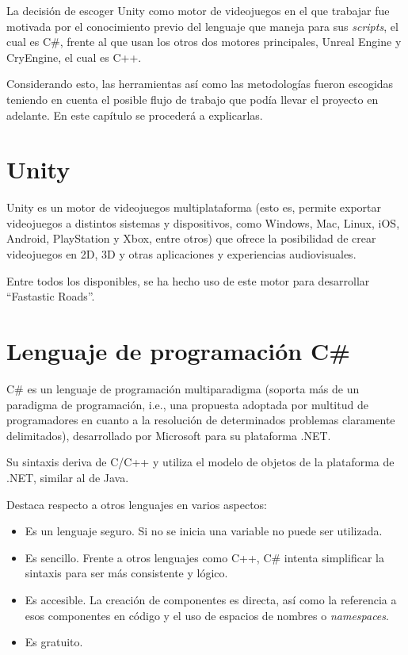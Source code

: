  \label{cap:tecnicas}
La decisión de escoger Unity como motor de videojuegos en el que trabajar fue motivada por el conocimiento previo del lenguaje que maneja para sus \textit{scripts}, el cual es C\#, frente al que usan los otros dos motores principales, Unreal Engine y CryEngine, el cual es C++.

Considerando esto, las herramientas así como las metodologías fueron escogidas teniendo en cuenta el posible flujo de trabajo que podía llevar el proyecto en adelante. En este capítulo se procederá a explicarlas.

\section{Unity}

Unity es un motor de videojuegos multiplataforma (esto es, permite exportar videojuegos a distintos sistemas y dispositivos, como Windows, Mac, Linux, iOS, Android, PlayStation y Xbox, entre otros) que ofrece la posibilidad de crear videojuegos en 2D, 3D y otras aplicaciones y experiencias audiovisuales.

Entre todos los disponibles, se ha hecho uso de este motor para desarrollar ``Fastastic Roads''.

\section{Lenguaje de programación C\#}

C\# es un lenguaje de programación multiparadigma (soporta más de un paradigma de programación, i.e., una propuesta adoptada por multitud de programadores en cuanto a la resolución de determinados problemas claramente delimitados), desarrollado por Microsoft para su plataforma .NET.

Su sintaxis deriva de C/C++ y utiliza el modelo de objetos de la plataforma de .NET, similar al de Java.

Destaca respecto a otros lenguajes en varios aspectos:
\begin{itemize}
\tightlist
    \item Es un lenguaje seguro. Si no se inicia una variable no puede ser utilizada.
    \item Es sencillo. Frente a otros lenguajes como C++, C\# intenta simplificar la sintaxis para ser más consistente y lógico.
    \item Es accesible. La creación de componentes es directa, así como la referencia a esos componentes en código y el uso de espacios de nombres o \textit{namespaces}.
    \item Es gratuito.
\end{itemize}

